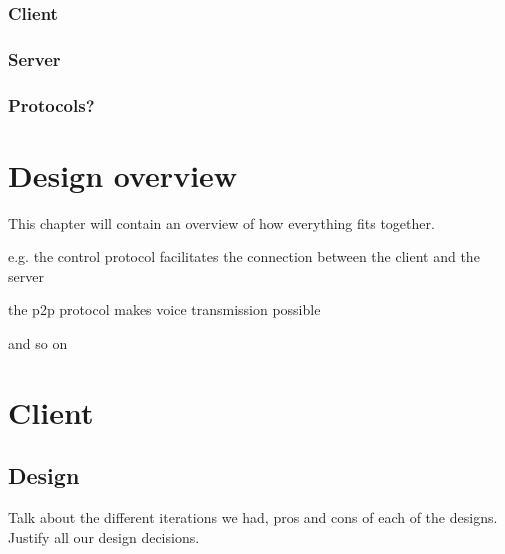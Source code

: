 \documentclass{l3proj}
\begin{document}

\subsection{Client}


\subsection{Server}


\subsection{Protocols?}



\chapter{Design overview}
\label{design-overview}

This chapter will contain an overview of how everything fits together.

e.g. the control protocol facilitates the connection between the client and the server

the p2p protocol makes voice transmission possible 

and so on


\chapter{Client}
\label{client}


\section{Design}

Talk about the different iterations we had, pros and cons of each of the designs. Justify all our design decisions. 

\end{document}
